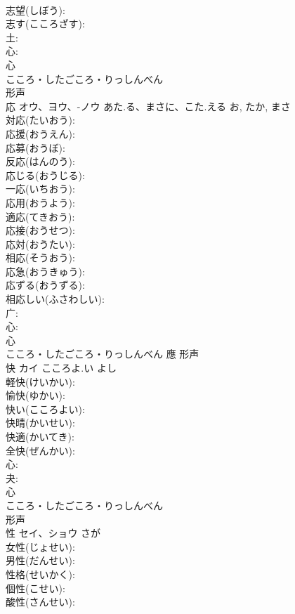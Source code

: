 \documentclass[8pt]{extreport}
\begin{document}
\begin{CJK}{UTF8}{min}
\\	志望(しぼう): 
\\	志す(こころざす): 
\\	土: 
\\	心: 
\\	心	
\\	こころ・したごころ・りっしんべん	
\\	形声 
\\	応	オウ、ヨウ、-ノウ	あた.る、まさに、こた.える	お, たか, まさ	
\\	対応(たいおう): 
\\	応援(おうえん): 
\\	応募(おうぼ): 
\\	反応(はんのう): 
\\	応じる(おうじる): 
\\	一応(いちおう): 
\\	応用(おうよう): 
\\	適応(てきおう): 
\\	応接(おうせつ): 
\\	応対(おうたい): 
\\	相応(そうおう): 
\\	応急(おうきゅう): 
\\	応ずる(おうずる): 
\\	相応しい(ふさわしい): 
\\	广: 
\\	心: 
\\	心	
\\	こころ・したごころ・りっしんべん	應	形声 
\\	快	カイ	こころよ.い	よし	
\\	軽快(けいかい): 
\\	愉快(ゆかい): 
\\	快い(こころよい): 
\\	快晴(かいせい): 
\\	快適(かいてき): 
\\	全快(ぜんかい): 
\\	心: 
\\	夬: 
\\	心	
\\	こころ・したごころ・りっしんべん	
\\	形声 
\\	性	セイ、ショウ	さが		
\\	女性(じょせい): 
\\	男性(だんせい): 
\\	性格(せいかく): 
\\	個性(こせい): 
\\	酸性(さんせい): 

\end{CJK}
\end{document}
